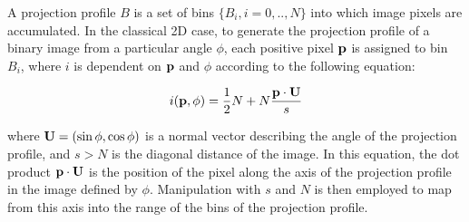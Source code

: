 
A projection profile $B$ is a set of bins $\{B_i, i=0,..,N\}$ into which image
pixels are accumulated.  In the classical 2D case, to generate the projection
profile of a binary image from a particular angle $\phi$, each positive pixel
${ \bf p }$ is assigned to bin $B_i$, where $i$ is dependent on ${ \bf p }$ and
$\phi$ according to the following equation:

\begin{equation} \label{classicproj} 
i({ \bf p },\phi) = \frac{1}{2} N + N
\frac{ { \bf p } \cdot { \bf U } }{ s } 
\end{equation}

{ \parindent 0mm where ${ \bf U }=(\sin \phi,\cos \phi)$ is a normal vector
describing the angle of the projection profile, and $s>N$ is the diagonal
distance of the image.  In this equation, the dot product ${ \bf p } \cdot
{ \bf U }$ is the position of the pixel along the axis of the projection profile
in the image defined by $\phi$.  Manipulation with $s$ and $N$ is then employed
to map from this axis into the range of the bins of the projection profile.  }



